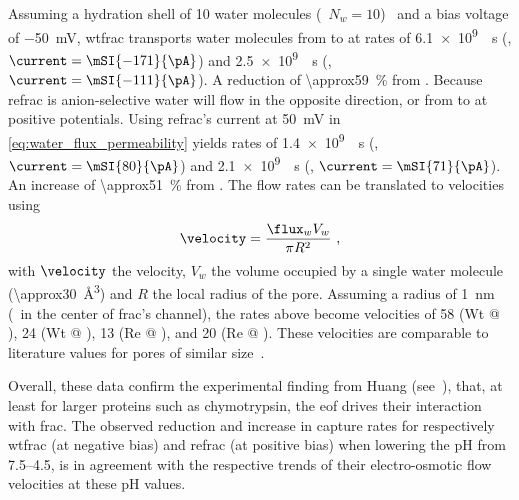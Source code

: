 Assuming a hydration shell of 10 water molecules (\ie~$N_{w} = 10$)~\cite{Boukhet-2016,Piguet-2014} and a bias
voltage of \SI{-50}{\mV}, \gls{wtfrac} transports water molecules from \cisi{} to \transi{} at rates of
\SI{6.1e9}{\per\second} (, $\current = \mSI{-171}{\pA}$) and \SI{2.5e9}{\per\second} (,
$\current = \mSI{-111}{\pA}$). A reduction of \SI{\approx59}{\percent} from . Because
\Gls{refrac} is anion-selective water will flow in the opposite direction, or from \cisi{} to \transi{} at
positive potentials. Using \gls{refrac}'s current at \SI{+50}{\mV} in \cref{eq:water_flux_permeability} yields
rates of \SI{1.4e9}{\per\second} (, $\current = \mSI{80}{\pA}$) and \SI{2.1e9}{\per\second} (,
$\current = \mSI{71}{\pA}$). An increase of \SI{\approx51}{\percent} from . The flow rates
can be translated to velocities using
%
\begin{equation}\label{eq:water_flux_to_velocity}
  \velocity = \dfrac{\flux_{w} V_{w}}{\pi R^2}
  \text{ ,}
\end{equation}
%
with $\velocity$ the velocity, $V_{w}$ the volume occupied by a single water molecule
(\SI{\approx30}{\cubic\angstrom}) and $R$ the local radius of the pore. Assuming a radius of \SI{1}{\nm}
(\eg~in the center of \gls{frac}'s channel), the rates above become velocities of \SI{58}{\mmps} (Wt @
), \SI{24}{\mmps} (Wt @ ), \SI{13}{\mmps} (Re @ ), and \SI{20}{\mmps} (Re @ ).
These velocities are comparable to literature values for pores of similar
size~\cite{Boukhet-2016,Piguet-2014,Pederson-2015}.

Overall, these data confirm the experimental finding from Huang \etal{} (see~\cite{Huang-2017}), that, at
least for larger proteins such as chymotrypsin, the \gls{eof} drives their interaction with \gls{frac}. The
observed reduction and increase in capture rates for respectively \gls{wtfrac} (at negative bias) and
\gls{refrac} (at positive bias) when lowering the pH from \numrange{7.5}{4.5}, is in agreement with the
respective trends of their electro-osmotic flow velocities at these pH values.


